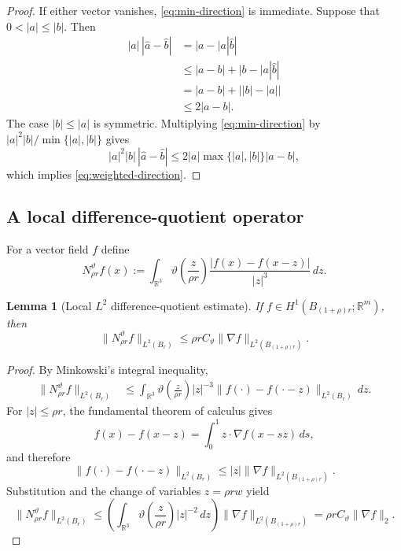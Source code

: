 \documentclass[11pt]{article}
\numberwithin{equation}{section}
\theoremstyle{plain}
\newtheorem{lemma}[theorem]{Lemma}
\theoremstyle{definition}
\theoremstyle{remark}
\newcommand{\R}{\mathbb R}
\begin{document}
\begin{proof}
If either vector vanishes, \eqref{eq:min-direction} is immediate. Suppose that $0<|a|\le|b|$. Then
\begin{align*}
|a|\,|\widehat a-\widehat b|
&=|a-|a|\widehat b|\\
&\le |a-b|+|b-|a|\widehat b|\\
&=|a-b|+\bigl||b|-|a|\bigr|\\
&\le2|a-b|.
\end{align*}
The case $|b|\le|a|$ is symmetric. Multiplying \eqref{eq:min-direction} by $|a|^2|b|/\min\{|a|,|b|\}$ gives
\[
|a|^2|b|\,|\widehat a-\widehat b|
\le2|a|\max\{|a|,|b|\}|a-b|,
\]
which implies \eqref{eq:weighted-direction}.
\end{proof}

\subsection{A local difference-quotient operator}

For a vector field $f$ define
\begin{equation}\label{eq:N-def}
N_{\rho r}^{\vartheta}f(x)
:=
\int_{\R^3}
\vartheta\!\left(\frac z{\rho r}\right)
\frac{|f(x)-f(x-z)|}{|z|^3}\,dz.
\end{equation}

\begin{lemma}[Local $L^2$ difference-quotient estimate]\label{lem:difference-quotient}
If $f\in H^1(B_{(1+\rho)r};\R^m)$, then
\begin{equation}\label{eq:N-L2}
\|N_{\rho r}^{\vartheta}f\|_{L^2(B_r)}
\le
\rho r C_\vartheta
\|\nabla f\|_{L^2(B_{(1+\rho)r})}.
\end{equation}
\end{lemma}

\begin{proof}
By Minkowski's integral inequality,
\begin{align*}
\|N_{\rho r}^{\vartheta}f\|_{L^2(B_r)}
&\le
\int_{\R^3}
\vartheta\!\left(\frac z{\rho r}\right)|z|^{-3}
\|f(\cdot)-f(\cdot-z)\|_{L^2(B_r)}\,dz.
\end{align*}
For $|z|\le\rho r$, the fundamental theorem of calculus gives
\[
f(x)-f(x-z)
=\int_0^1 z\cdot\nabla f(x-sz)\,ds,
\]
and therefore
\[
\|f(\cdot)-f(\cdot-z)\|_{L^2(B_r)}
\le |z|\|\nabla f\|_{L^2(B_{(1+\rho)r})}.
\]
Substitution and the change of variables $z=\rho rw$ yield
\[
\|N_{\rho r}^{\vartheta}f\|_{L^2(B_r)}
\le
\left(
\int_{\R^3}\vartheta\!\left(\frac z{\rho r}\right)|z|^{-2}\,dz
\right)
\|\nabla f\|_{L^2(B_{(1+\rho)r})}
=
\rho rC_\vartheta\|\nabla f\|_2.
\]
\end{proof}
\end{document}
